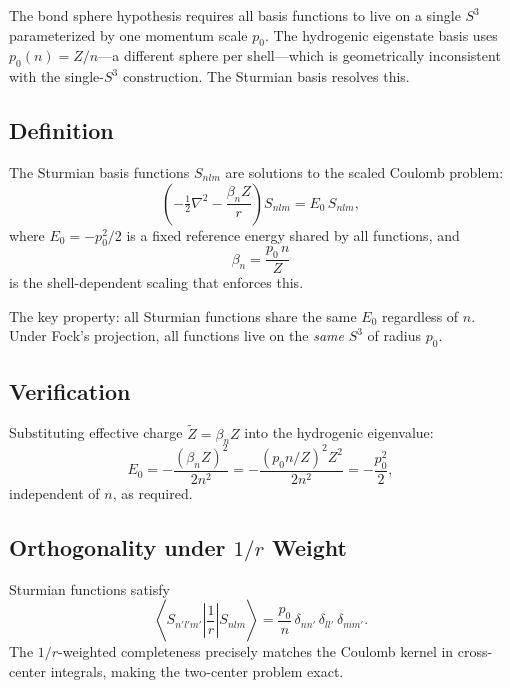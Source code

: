 \documentclass[aps,pra,twocolumn,superscriptaddress,longbibliography]{revtex4-2}
\begin{document}
The bond sphere hypothesis requires all basis functions to live on a
single $S^3$ parameterized by one momentum scale $p_0$.  The
hydrogenic eigenstate basis uses $p_0(n) = Z/n$---a different sphere
per shell---which is geometrically inconsistent with the single-$S^3$
construction.  The Sturmian basis resolves this.

\subsection{Definition}

The Sturmian basis functions $S_{nlm}$ are solutions to the scaled
Coulomb problem:
\begin{equation}
\left(-\tfrac{1}{2}\nabla^2 - \frac{\beta_n Z}{r}\right) S_{nlm}
  = E_0\, S_{nlm},
\label{eq:sturmian_eq}
\end{equation}
where $E_0 = -p_0^2/2$ is a fixed reference energy shared by all
functions, and
\begin{equation}
\beta_n = \frac{p_0\, n}{Z}
\label{eq:beta_n}
\end{equation}
is the shell-dependent scaling that enforces this.

The key property: all Sturmian functions share the same $E_0$
regardless of $n$.  Under Fock's projection, all functions live on
the \emph{same} $S^3$ of radius $p_0$.

\subsection{Verification}

Substituting effective charge $\tilde{Z} = \beta_n Z$ into the
hydrogenic eigenvalue:
\begin{equation}
E_0 = -\frac{(\beta_n Z)^2}{2n^2}
     = -\frac{(p_0 n / Z)^2 Z^2}{2n^2}
     = -\frac{p_0^2}{2},
\label{eq:sturmian_verify}
\end{equation}
independent of $n$, as required.

\subsection{Orthogonality under $1/r$ Weight}

Sturmian functions satisfy
\begin{equation}
\left\langle S_{n'l'm'}\left|\frac{1}{r}\right| S_{nlm}\right\rangle
  = \frac{p_0}{n}\,\delta_{nn'}\,\delta_{ll'}\,\delta_{mm'}.
\label{eq:sturmian_orthog}
\end{equation}
The $1/r$-weighted completeness precisely matches the Coulomb kernel
in cross-center integrals, making the two-center problem exact.
\end{document}
